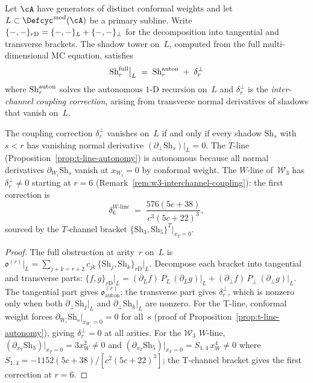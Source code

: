 \begin{proposition}
\label{prop:interchannel-coupling}
\ClaimStatusProvedHere
{}
Let $\cA$ have generators of distinct conformal weights and let
$L \subset \Defcyc^{\mathrm{mod}}(\cA)$ be a primary subline.
Write $\{-,-\}_{r\textup{D}} = \{-,-\}_L + \{-,-\}_\perp$
for the decomposition into tangential and transverse brackets.
The shadow tower on~$L$, computed from the full multi-dimensional
MC equation, satisfies
\[
  \mathrm{Sh}_r^{\textup{full}}\big|_L
  \;=\;
  \mathrm{Sh}_r^{\textup{auton}}
  \;+\;
  \delta_r^{\perp}
\]
where $\mathrm{Sh}_r^{\textup{auton}}$ solves the autonomous $1$-D
recursion on~$L$ and
$\delta_r^{\perp}$ is the \emph{inter-channel coupling correction},
arising from transverse normal derivatives of shadows that vanish on~$L$.

The coupling correction $\delta_r^\perp$ vanishes on~$L$ if and only if
every shadow $\mathrm{Sh}_s$ with $s < r$ has vanishing normal derivative
$(\partial_\perp \mathrm{Sh}_s)|_L = 0$.  The $T$-line
\textup{(}Proposition~\textup{\ref{prop:t-line-autonomy})}
is autonomous because all normal derivatives $\partial_{W_i}\mathrm{Sh}_s$
vanish at $x_{W_i} = 0$ by conformal weight.  The $W$-line of~$\mathcal{W}_3$
has $\delta_r^\perp \neq 0$ starting at $r = 6$
\textup{(}Remark~\textup{\ref{rem:w3-interchannel-coupling}):}
the first correction is
\begin{equation}\label{eq:interchannel-delta6}
  \delta_6^{W\text{-line}}
  \;=\;
  \frac{576(5c+38)}{c^3(5c+22)^3},
\end{equation}
sourced by the $T$-channel bracket
$\{\mathrm{Sh}_3, \mathrm{Sh}_5\}^T|_{x_T = 0}$.
\end{proposition}

\begin{proof}
The full obstruction at arity~$r$ on~$L$ is
$\mathfrak{o}^{(r)}\big|_L = \sum_{j+k=r+2}
c_{jk}\,\{\mathrm{Sh}_j, \mathrm{Sh}_k\}_{r\text{D}}\big|_L$.
Decompose each bracket into tangential and transverse parts:
$\{f, g\}_{r\text{D}}\big|_L
= (\partial_L f)\,P_L\,(\partial_L g)\big|_L
+ (\partial_\perp f)\,P_\perp\,(\partial_\perp g)\big|_L$.
The tangential part gives $\mathfrak{o}^{(r)}_{\text{auton}}$;
the transverse part gives $\delta_r^\perp$, which is
nonzero only when both $\partial_\perp \mathrm{Sh}_j\big|_L$ and
$\partial_\perp \mathrm{Sh}_k\big|_L$ are nonzero.
For the T-line, conformal weight forces
$\partial_{W_i}\mathrm{Sh}_s\big|_{x_{W_i}=0} = 0$
for all~$s$ (proof of
Proposition~\ref{prop:t-line-autonomy}),
giving $\delta_r^\perp = 0$ at all arities.
For the $\mathcal{W}_3$ $W$-line,
$(\partial_{x_T}\mathrm{Sh}_3)|_{x_T=0} = 3x_W^2 \neq 0$ and
$(\partial_{x_T}\mathrm{Sh}_5)|_{x_T=0} = S_{1,4}\,x_W^4 \neq 0$
where $S_{1,4} = -1152(5c{+}38)/[c^2(5c{+}22)^3]$;
the T-channel bracket gives the first correction at $r = 6$.
\end{proof}

